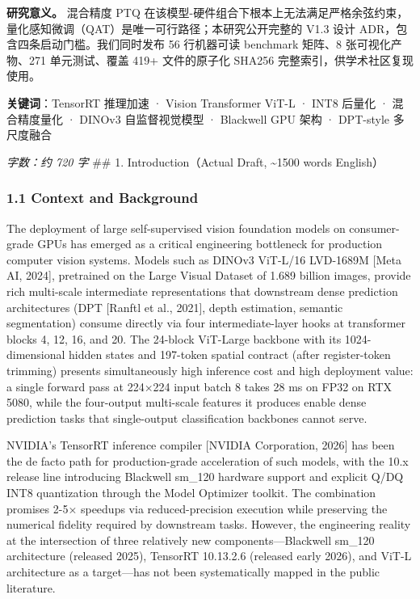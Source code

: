 \documentclass[
]{article}
\begin{document}
\textbf{研究意义。} 混合精度 PTQ
在该模型-硬件组合下根本上无法满足严格余弦约束，量化感知微调（QAT）是唯一可行路径；本研究公开完整的
V1.3 设计 ADR，包含四条启动门槛。我们同时发布 56 行机器可读 benchmark
矩阵、8 张可视化产物、271 单元测试、覆盖 419+ 文件的原子化 SHA256
完整索引，供学术社区复现使用。

\textbf{关键词}：TensorRT 推理加速 · Vision Transformer ViT-L · INT8
后量化 · 混合精度量化 · DINOv3 自监督视觉模型 · Blackwell GPU 架构 ·
DPT-style 多尺度融合

\emph{字数：约 720 字} \#\# 1. Introduction（Actual Draft,
\textasciitilde1500 words English）

\subsubsection{1.1 Context and Background}\label{context-and-background}

The deployment of large self-supervised vision foundation models on
consumer-grade GPUs has emerged as a critical engineering bottleneck for
production computer vision systems. Models such as DINOv3 ViT-L/16
LVD-1689M {[}Meta AI, 2024{]}, pretrained on the Large Visual Dataset of
1.689 billion images, provide rich multi-scale intermediate
representations that downstream dense prediction architectures (DPT
{[}Ranftl et al., 2021{]}, depth estimation, semantic segmentation)
consume directly via four intermediate-layer hooks at transformer blocks
4, 12, 16, and 20. The 24-block ViT-Large backbone with its
1024-dimensional hidden states and 197-token spatial contract (after
register-token trimming) presents simultaneously high inference cost and
high deployment value: a single forward pass at 224×224 input batch 8
takes 28 ms on FP32 on RTX 5080, while the four-output multi-scale
features it produces enable dense prediction tasks that single-output
classification backbones cannot serve.

NVIDIA's TensorRT inference compiler {[}NVIDIA Corporation, 2026{]} has
been the de facto path for production-grade acceleration of such models,
with the 10.x release line introducing Blackwell sm\_120 hardware
support and explicit Q/DQ INT8 quantization through the Model Optimizer
toolkit. The combination promises 2-5× speedups via reduced-precision
execution while preserving the numerical fidelity required by downstream
tasks. However, the engineering reality at the intersection of three
relatively new components---Blackwell sm\_120 architecture (released
2025), TensorRT 10.13.2.6 (released early 2026), and ViT-L architecture
as a target---has not been systematically mapped in the public
literature.
\end{document}

